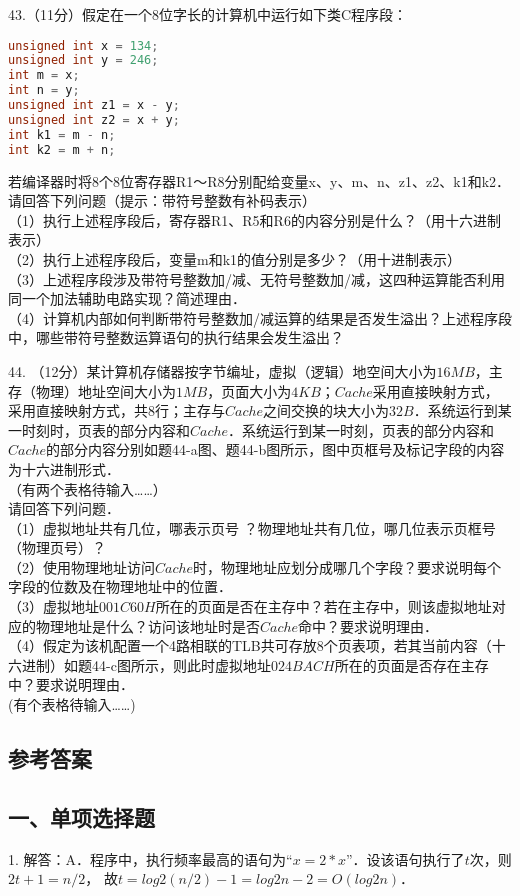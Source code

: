 43.（11分）假定在一个8位字长的计算机中运行如下类C程序段：
\begin{lstlisting}[language=cpp]
unsigned int x = 134;
unsigned int y = 246;
int m = x;
int n = y;
unsigned int z1 = x - y;
unsigned int z2 = x + y;
int k1 = m - n;
int k2 = m + n;
\end{lstlisting}
若编译器时将8个8位寄存器R1～R8分别配给变量x、y、m、n、z1、z2、k1和k2．请回答下列问题（提示：带符号整数有补码表示） \\
（1）执行上述程序段后，寄存器R1、R5和R6的内容分别是什么？（用十六进制表示） \\
（2）执行上述程序段后，变量m和k1的值分别是多少？（用十进制表示）  \\
（3）上述程序段涉及带符号整数加/减、无符号整数加/减，这四种运算能否利用同一个加法辅助电路实现？简述理由． \\
（4）计算机内部如何判断带符号整数加/减运算的结果是否发生溢出？上述程序段中，哪些带符号整数运算语句的执行结果会发生溢出？

44. （12分）某计算机存储器按字节编址，虚拟（逻辑）地空间大小为$16MB$，主存（物理）地址空间大小为$1MB$，页面大小为$4KB$；$Cache$采用直接映射方式，采用直接映射方式，共$8$行；主存与$Cache$之间交换的块大小为$32B$．系统运行到某一时刻时，页表的部分内容和$Cache$．系统运行到某一时刻，页表的部分内容和$Cache$的部分内容分别如题44-a图、题44-b图所示，图中页框号及标记字段的内容为十六进制形式．  \\
（有两个表格待输入……） \\
请回答下列问题． \\
（1）虚拟地址共有几位，哪表示页号 ？物理地址共有几位，哪几位表示页框号（物理页号）？ \\
（2）使用物理地址访问$Cache$时，物理地址应划分成哪几个字段？要求说明每个字段的位数及在物理地址中的位置． \\
（3）虚拟地址$001C60H$所在的页面是否在主存中？若在主存中，则该虚拟地址对应的物理地址是什么？访问该地址时是否$Cache$命中？要求说明理由． \\
（4）假定为该机配置一个4路相联的TLB共可存放8个页表项，若其当前内容（十六进制）如题44-c图所示，则此时虚拟地址$024BACH$所在的页面是否存在主存中？要求说明理由． \\
(有个表格待输入……)


\subsection{参考答案}
\subsection{一、单项选择题}
1. 解答：A．程序中，执行频率最高的语句为“$x=2*x$”．设该语句执行了$t$次，则$2t+1=n/2$， 故$t=log2(n/2)-1=log2n-2= O(log2n)$．


